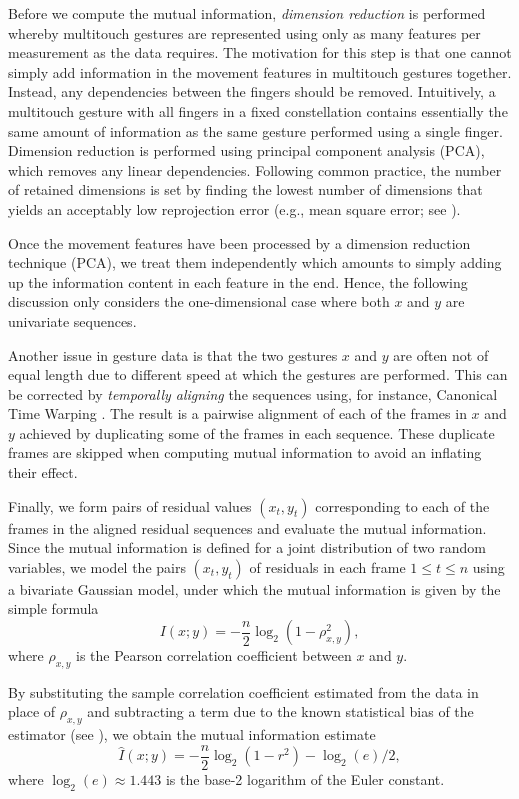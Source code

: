 \documentclass{sig-alternate-10pt}
\begin{document}
Before we compute the mutual information, \emph{dimension reduction} is performed whereby multitouch gestures are represented using only as many features per measurement as the data requires.
The motivation for this step is that one cannot simply add information in the movement features in multitouch gestures together. Instead, any dependencies between the fingers should be removed.
Intuitively, a multitouch gesture with all fingers in a fixed constellation contains essentially the same amount of information as the same gesture performed using a single finger.
Dimension reduction is performed using principal component analysis (PCA), which removes any linear dependencies. Following common practice, the number of retained dimensions is set by finding the lowest number of dimensions that yields an acceptably low reprojection error (e.g., mean square error; see \cite{oulasvirta2013information}). 

Once the movement features have been processed by a dimension reduction technique (PCA), we treat them independently which amounts to simply adding up the information content in each feature in the end. Hence, the following discussion only considers the one-dimensional case where both $x$ and $y$ are univariate sequences.

Another issue in gesture data is that the two gestures $x$ and $y$ are often not of equal length due to different speed at which the
gestures are performed. This can be corrected by \emph{temporally aligning} the sequences using, for instance,
Canonical Time Warping \cite{zhou2009canonical}. The result is a pairwise alignment of each of the frames in $x$ and $y$ achieved
by duplicating some of the frames in each sequence. These duplicate frames are skipped when computing mutual information
to avoid an inflating their effect. 

Finally, we form pairs of residual values $(x_t,y_t)$ corresponding to each of the frames in the aligned residual sequences and evaluate the mutual information.
Since the mutual information is defined for a joint distribution of two random variables, we model the pairs $(x_t, y_t)$ of residuals in each frame $1 \leq t \leq n$ using a bivariate Gaussian model, under which the
mutual information is given by the simple formula
\begin{equation}
I(x;y) = -\frac{n}{2} \log_2(1-\rho_{x,y}^{2}),
\end{equation}
where $\rho_{x,y}$ is the Pearson correlation coefficient between $x$ and $y$.

By substituting the sample correlation coefficient estimated from the data in place of $\rho_{x,y}$ and subtracting a term due to the known statistical bias of the estimator (see \cite{oulasvirta2013information}), we obtain
the mutual information estimate
\begin{equation}
\hat I(x;y) = - \frac{n}{2} \log_2(1-r^{2}) - \log_2(e)/2,
\end{equation}
where $\log_2(e) \approx 1.443$ is the base-2 logarithm of the Euler constant.
\end{document}
